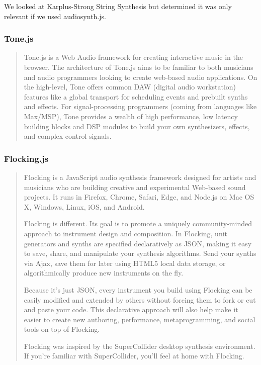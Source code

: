 \documentclass[12pt,a4paper]{article}
\begin{document}
We looked at Karplus-Strong String Synthesis but determined it was only relevant if we used audiosynth.js.

\subsubsection{Tone.js}

\begin{quote}
Tone.js is a Web Audio framework for creating interactive music in the browser. The architecture of Tone.js aims to be familiar to both musicians and audio programmers looking to create web-based audio applications. On the high-level, Tone offers common DAW (digital audio workstation) features like a global transport for scheduling events and prebuilt synths and effects. For signal-processing programmers (coming from languages like Max/MSP), Tone provides a wealth of high performance, low latency building blocks and DSP modules to build your own synthesizers, effects, and complex control signals. \cite{tonejs}
\end{quote}

\subsubsection{Flocking.js}

\begin{quote}
Flocking is a JavaScript audio synthesis framework designed for artists and musicians who are building creative and experimental Web-based sound projects. It runs in Firefox, Chrome, Safari, Edge, and Node.js on Mac OS X, Windows, Linux, iOS, and Android.

Flocking is different. Its goal is to promote a uniquely community-minded approach to instrument design and composition. In Flocking, unit generators and synths are specified declaratively as JSON, making it easy to save, share, and manipulate your synthesis algorithms. Send your synths via Ajax, save them for later using HTML5 local data storage, or algorithmically produce new instruments on the fly.

Because it's just JSON, every instrument you build using Flocking can be easily modified and extended by others without forcing them to fork or cut and paste your code. This declarative approach will also help make it easier to create new authoring, performance, metaprogramming, and social tools on top of Flocking.

Flocking was inspired by the SuperCollider desktop synthesis environment. If you're familiar with SuperCollider, you'll feel at home with Flocking. \cite{flocking}
\end{quote}
\end{document}

